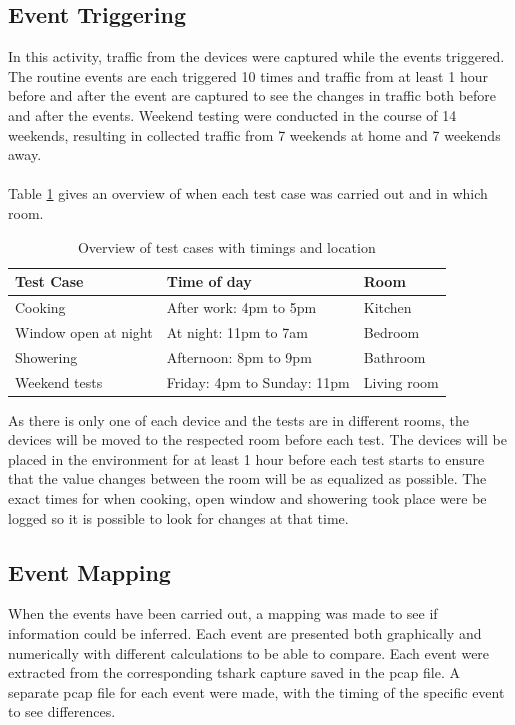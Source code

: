 \subsection{Event Triggering}
In this activity, traffic from the devices were captured while the events triggered. The routine events are each triggered 10 times and traffic from at least 1 hour before and after the event are captured to see the changes in traffic both before and after the events. Weekend testing were conducted in the course of 14 weekends, resulting in collected traffic from 7 weekends at home and 7 weekends away. 
\\\\
Table \ref{tab:TestCases} gives an overview of when each test case was carried out and in which room. 
\begin{table}[H]
    \centering
    \caption{Overview of test cases with timings and location}
    \begin{adjustbox}{width=1\textwidth}
    \begin{tabular}{| p{5cm} | p{5cm} | p{3cm} |} 
        \hline
        \textbf{Test Case} & \textbf{Time of day} & \textbf{Room} \\
        \hline
        Cooking & After work: 4pm to 5pm & Kitchen \\
        \hline
        Window open at night & At night: 11pm to 7am & Bedroom\\
        \hline
        Showering & Afternoon: 8pm to 9pm & Bathroom \\
        \hline
        Weekend tests & Friday: 4pm to Sunday: 11pm & Living room \\
        \hline
    \end{tabular}
    \end{adjustbox}
    \label{tab:TestCases}
\end{table}

As there is only one of each device and the tests are in different rooms, the devices will be moved to the respected room before each test. The devices will be placed in the environment for at least 1 hour before each test starts to ensure that the value changes between the room will be as equalized as possible. The exact times for when cooking, open window and showering took place were be logged so it is possible to look for changes at that time. 

\subsection{Event Mapping}
When the events have been carried out, a mapping was made to see if information could be inferred. Each event are presented both graphically and numerically with different calculations to be able to compare. Each event were extracted from the corresponding tshark capture saved in the pcap file. A separate pcap file for each event were made, with the timing of the specific event to see differences. 

